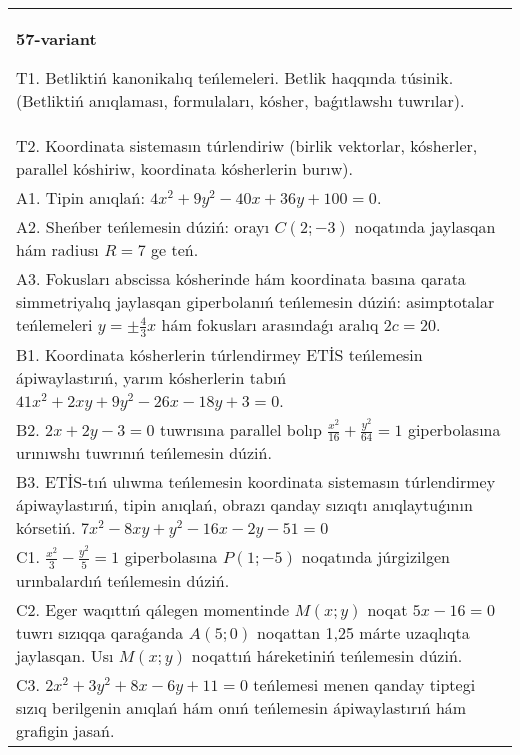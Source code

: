 \documentclass{article}
\begin{document}
\begin{tabular}{m{17cm}}
\textbf{57-variant}
\newline

T1. Betliktiń kanonikalıq teńlemeleri. Betlik haqqında túsinik. (Betliktiń anıqlaması, formulaları, kósher, baǵıtlawshı tuwrılar).\\

T2. Koordinata sistemasın túrlendiriw (birlik vektorlar, kósherler, parallel kóshiriw, koordinata kósherlerin burıw).\\

A1. Tipin anıqlań: $4 x^2+9 y^2-40 x+36 y+100=0$.\\

A2. Sheńber teńlemesin dúziń: orayı $C (2;-3) $ noqatında jaylasqan hám radiusı $R=7$ ge teń.\\

A3. Fokusları abscissa kósherinde hám koordinata basına qarata simmetriyalıq jaylasqan giperbolanıń teńlemesin dúziń: asimptotalar teńlemeleri $y=\pm \frac{4}{3}x$ hám fokusları arasındaǵı aralıq $2 c=20$.\\

B1. Koordinata kósherlerin túrlendirmey ETİS teńlemesin ápiwaylastırıń, yarım kósherlerin tabıń $41x^{2} + 2xy + 9y^{2} - 26x - 18y + 3 = 0$.  \\

B2. $2x + 2y - 3 = 0$ tuwrısına parallel bolıp $\frac{x^{2}}{16} + \frac{y^{2}}{64} = 1$ giperbolasına urınıwshı tuwrınıń teńlemesin dúziń.  \\

B3. ETİS-tıń ulıwma teńlemesin koordinata sistemasın túrlendirmey ápiwaylastırıń, tipin anıqlań, obrazı qanday sızıqtı anıqlaytuǵının kórsetiń. $7x^{2} - 8xy + y^{2} - 16x - 2y - 51 = 0$  \\

C1. $\frac{x^{2}}{3} - \frac{y^{2}}{5} = 1$ giperbolasına $P(1; - 5)$ noqatında júrgizilgen urınbalardıń teńlemesin dúziń.\\

C2. Eger waqıttıń qálegen momentinde $M(x;y)$ noqat $5x - 16 = 0$ tuwrı sızıqqa qaraǵanda $A(5;0)$ noqattan 1,25 márte uzaqlıqta jaylasqan. Usı $M(x;y)$ noqattıń háreketiniń teńlemesin dúziń.  \\

C3. $2x^{2} + 3y^{2} + 8x - 6y + 11 = 0$ teńlemesi menen qanday tiptegi sızıq berilgenin anıqlań hám onıń teńlemesin ápiwaylastırıń hám grafigin jasań.  \\

\end{tabular}
\vspace{1cm}
\end{document}
